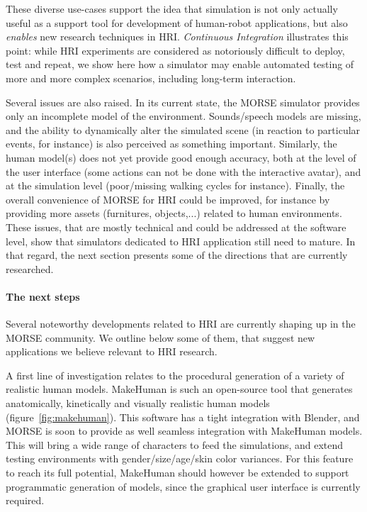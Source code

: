 \documentclass[conference]{IEEEtran}
\begin{document}
These diverse use-cases support the idea that simulation is not only actually
useful as a support tool for development of human-robot applications, but also
\emph{enables} new research techniques in HRI. \emph{Continuous Integration}
illustrates this point: while HRI experiments are considered as notoriously
difficult to deploy, test and repeat, we show here how a simulator may enable
automated testing of more and more complex scenarios, including long-term
interaction.

Several issues are also raised. In its current state, the MORSE simulator
provides only an incomplete model of the environment. Sounds/speech models are
missing, and the ability to dynamically alter the simulated scene (in reaction
to particular events, for instance) is also perceived as something important.
Similarly, the human model(s) does not yet provide good enough accuracy, both at
the level of the user interface (some actions can not be done with the
interactive avatar), and at the simulation level (poor/missing walking cycles
for instance). Finally, the overall convenience of MORSE for HRI could be
improved, for instance by providing more assets (furnitures, objects,...)
related to human environments.  These issues, that are mostly technical and
could be addressed at the software level, show that simulators dedicated to HRI
application still need to mature.  In that regard, the next section presents
some of the directions that are currently researched.

\paragraph*{The next steps}

Several noteworthy developments related to HRI are currently shaping up in the
MORSE community. We outline below some of them, that suggest new applications we
believe relevant to HRI research.

A first line of investigation relates to the procedural generation of a variety
of realistic human models. {\sc MakeHuman} is such an open-source tool that
generates anatomically, kinetically and visually realistic human models
(figure~\ref{fig:makehuman}). This software has a tight integration with Blender,
and MORSE is soon to provide as well seamless integration with {\sc MakeHuman}
models. This will bring a wide range of characters to feed the simulations,
and extend testing environments with gender/size/age/skin color variances.  For
this feature to reach its full potential, {\sc MakeHuman} should however be
extended to support programmatic generation of models, since the graphical user
interface is currently required.
\end{document}
